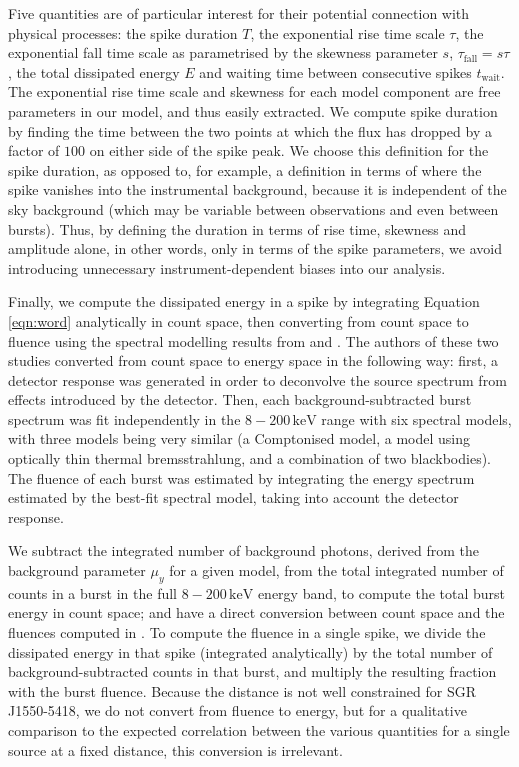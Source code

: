 \documentclass[12pt]{emulateapj}
\newcommand{\counts}{y}
\begin{document}
Five quantities are of particular interest for their potential connection with physical processes: the spike duration $T$, the exponential rise time scale $\tau$, the exponential fall
time scale as parametrised by the skewness parameter $s$, $\tau_{\mathrm{fall}} = s\tau$, the total dissipated energy $E$ and waiting time between consecutive spikes $t_\mathrm{wait}$. The exponential rise time scale and skewness for each model component are free parameters
in our model, and thus easily extracted. We compute spike duration by finding the time between the two points at which the flux has dropped by a
 factor of $100$ on either side of the spike peak. We choose this definition for the spike duration, as opposed to, for example, a definition in terms of where the spike vanishes
 into the instrumental background, because it is independent of the sky background (which may be variable between observations and even between bursts). Thus, by defining the 
 duration in terms of rise time, skewness and amplitude alone, in other words, only in terms of the spike parameters, we avoid introducing unnecessary instrument-dependent
 biases into our analysis.


 Finally, we compute the dissipated energy in a spike by integrating Equation \ref{eqn:word} analytically in count space,
 then converting from count space to fluence using the spectral modelling results from \citet{vanderhorst2012} and \citet{vonkienlin2012}. The authors of these two studies converted from 
 count space to energy space in the following way: first, a detector response was generated in order to deconvolve the source spectrum from effects introduced by the detector. Then, each background-subtracted burst spectrum was fit independently in the $8-200\,\mathrm{keV}$ range with six spectral models, with three models being very similar (a Comptonised model, a model using optically thin thermal bremsstrahlung, and a combination of two blackbodies). The fluence of each burst was estimated by integrating the energy spectrum estimated by the best-fit spectral model, taking into account the detector response.
 
 We subtract the integrated number of 
 background photons, derived from the background parameter $\mu_\counts$ for a given model, from the total integrated number of 
 counts in a burst in the full $8-200\,\mathrm{keV}$ energy band, to compute the total burst energy in count space; and have a direct conversion between count space and 
 the fluences computed in \citet{vanderhorst2012}. To compute the fluence in a single spike, we divide the dissipated energy in that spike (integrated analytically)
 by the total number of background-subtracted counts in that burst, and multiply the resulting fraction with the burst fluence. 
 Because the distance is not well constrained for SGR J1550-5418, we do not convert from fluence to energy, but for a qualitative comparison to the expected correlation between the 
 various quantities for a single source at a fixed distance, this conversion is irrelevant.
  
\end{document}
